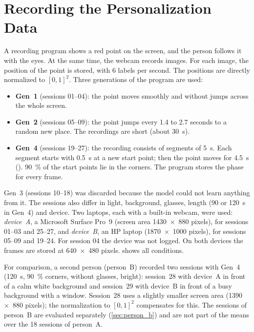 \section{Recording the Personalization Data}
\label{sec:meth_aufnahme}
A recording program shows a red point on the screen, and the person follows it
with the eyes. At the same time, the webcam records images. For each image, the
position of the point is stored, with 6 labels per second. The positions are directly
normalized to $[0,1]^2$. Three generations of the program are used:
\begin{itemize}
  \item \textbf{Gen~1} (sessions 01--04): the point moves smoothly and without
        jumps across the whole screen.
  \item \textbf{Gen~2} (sessions 05--09): the point jumps every 1.4 to 2.7
        seconds to a random new place. The recordings are short (about
        \SI{30}{\second}).
  \item \textbf{Gen~4} (sessions 19--27): the recording consists of segments of
        \SI{5}{\second}. Each segment starts with \SI{0.5}{\second}
         at a new start point; then the point moves for
        \SI{4.5}{\second} (). \SI{90}{\percent} of the start points
        lie in the corners. The program stores the phase for every frame.
\end{itemize}
Gen~3 (sessions 10--18) was discarded because the model could not learn
anything from it. The sessions also differ in light, background, glasses, length
(90 or \SI{120}{\second} in Gen~4) and device. Two laptops, each with a built-in
webcam, were used: \emph{device~A}, a Microsoft Surface Pro~9 (screen area
\num{1430}~$\times$~\num{880} pixels), for sessions 01--03 and 25--27, and
\emph{device~B}, an HP laptop (\num{1870}~$\times$~\num{1000} pixels), for
sessions 05--09 and 19--24. For session 04 the device was not logged. On both devices the
frames are stored at \num{640}~$\times$~\num{480} pixels.
 shows all conditions.

For comparison, a second person (person~B) recorded two sessions with Gen~4
(\SI{120}{\second}, \SI{90}{\percent} corners, without glasses, bright):
session~28 with device~A in front of a calm white background and session~29 with
device~B in front of a busy background with a window. Session~28 uses a slightly
smaller screen area (\num{1390}~$\times$~\num{880} pixels); the normalization
to $[0,1]^2$ compensates for this. The sessions of person~B are evaluated
separately (\cref{sec:person_b}) and are not part of the means over the 18
sessions of person~A.

